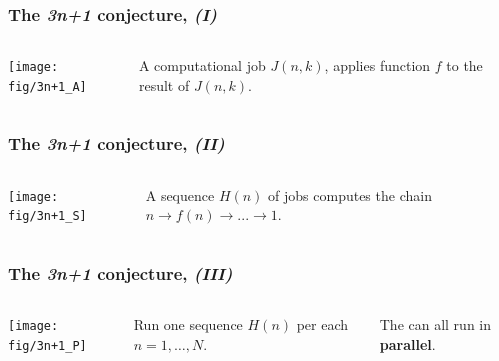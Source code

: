 \documentclass[english,serif,mathserif,xcolor=pdftex,dvipsnames,table]{beamer}
\begin{document}
  \begin{frame}
    \frametitle{The \emph{3n+1} conjecture, \emph{(I)}}
    \label{sec:7}

    \+
    \begin{columns}[c]
      \texttt{[image: fig/3n+1\_A]}

      A computational job $J(n,k)$, applies
      function $f$ to the result of $J(n,k)$.
    \end{columns}
  \end{frame}

  \begin{frame}
    \frametitle{The \emph{3n+1} conjecture, \emph{(II)}}
    \label{sec:7b}

    \+
    \begin{columns}[c]
      \texttt{[image: fig/3n+1\_S]}

      A sequence $H(n)$ of jobs computes the chain $n \to f(n) \to
      ... \to 1$.
    \end{columns}
  \end{frame}

  \begin{frame}
    \frametitle{The \emph{3n+1} conjecture, \emph{(III)}}
    \label{sec:7c}

    \+
    \begin{columns}[c]
      \texttt{[image: fig/3n+1\_P]}

      Run one sequence $H(n)$ per each $n = 1, \ldots, N$.

      \+
      The can all run in \textbf{parallel}.
    \end{columns}
  \end{frame}
\end{document}
